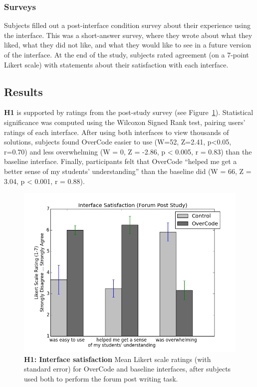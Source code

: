 \subsubsection{Surveys}
Subjects filled out a post-interface condition survey about their experience using the interface. This was a short-answer survey, where they wrote about what they liked, what they did not like, and what they would like to see in a future version of the interface. At the end of the study, subjects rated agreement (on a 7-point Likert scale) with statements about their satisfaction with each interface.

\subsection{Results}
\textbf{H1} is supported by ratings from the post-study survey (see Figure~\ref{study1Likert}). Statistical significance was computed using the Wilcoxon Signed Rank test, pairing users' ratings of each interface. After using both interfaces to view thousands of solutions, subjects found OverCode easier to use (W=52, Z=2.41, p<0.05, r=0.70) and less overwhelming (W = 0, Z = -2.86, p < 0.005, r = 0.83) than the baseline interface. Finally, participants felt that OverCode ``helped me get a better sense of my students' understanding'' than the baseline did (W = 66, Z = 3.04, p < 0.001, r = 0.88).

\begin{figure}
\centering
\includegraphics[scale=0.5]{Body/figures/overcode/study1Likert.png}
\caption{{\bf H1: Interface satisfaction} Mean Likert scale ratings (with standard error) for OverCode and baseline interfaces, after subjects used both to perform the forum post writing task.}
\label{study1Likert}
\end{figure}


